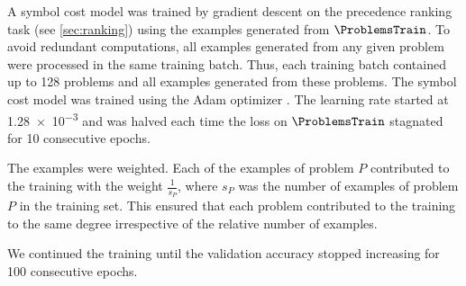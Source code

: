 A symbol cost model was trained by gradient descent
on the precedence ranking task (see \cref{sec:ranking})
using the examples generated from $\ProblemsTrain$.
To avoid redundant computations, all examples generated from any given problem were processed in the same training batch.
Thus, each training batch contained up to \num{128} problems and all examples generated from these problems.
The symbol cost model was trained using the Adam optimizer \cite{Kingma2014}.
The learning rate started at \num{1.28e-3}
and was halved each time the loss on $\ProblemsTrain$ stagnated for 10 consecutive epochs.

The examples were weighted.
Each of the examples of problem $P$ contributed to the training with the weight $\frac{1}{s_P}$,
where $s_P$ was the number of examples of problem $P$ in the training set.
This ensured that each problem contributed to the training to the same degree irrespective of the relative number of examples.


We continued the training until the validation accuracy stopped increasing for 100 consecutive epochs.

